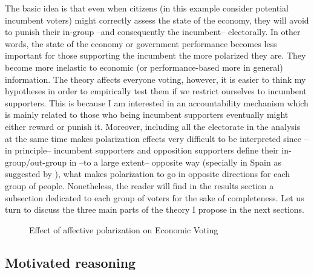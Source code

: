 \documentclass[a4paper, svgnames]{article}
\begin{document}
The basic idea is that even when citizens (in this example consider potential incumbent voters) might correctly assess the state of the economy, they will avoid to punish their in-group --and consequently the incumbent-- electorally. In other words, the state of the economy or government performance becomes less important for those supporting the incumbent the more polarized they are. They become more inelastic to economic (or performance-based more in general) information. The theory affects everyone voting, however, it is easier to think my hypotheses in order to empirically test them if we restrict ourselves to incumbent supporters. This is because I am interested in an accountability mechanism which is mainly related to those who being incumbent supporters eventually might either reward or punish it. Moreover, including all the electorate in the analysis at the same time makes polarization effects very difficult to be interpreted since --in principle-- incumbent supporters and opposition supporters define their in-group/out-group in --to a large extent-- opposite way (specially in Spain as suggested by \citet*{Orriols2020}), what makes polarization to go in opposite directions for each group of people. Nonetheless, the reader will find in the results section a subsection dedicated to each group of voters for the sake of completeness. Let us turn to discuss the three main parts of the theory I propose in the next sections.

\begin{figure}[H]
	\centering
	\caption{\label{fig:model} Effect of affective polarization on Economic Voting}
\end{figure}

\subsection{Motivated reasoning}
\end{document}
